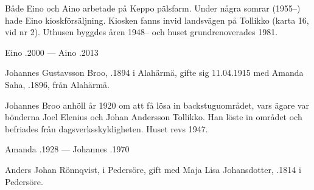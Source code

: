 Både Eino och Aino arbetade på Keppo pälsfarm. Under några somrar (1955--) hade Eino kioskförsäljning. Kiosken fanns invid landsvägen på Tollikko (karta 16, vid nr 2). Uthusen byggdes åren 1948-- och huset grundrenoverades 1981.

Eino .2000  ---  Aino .2013


%


%
Johannes Gustavsson Broo, .1894 i Alahärmä, gifte sig 11.04.1915 med Amanda Saha, .1896, från Alahärmä.
\begin{jhchildren}
  \item {}
  \item {}
  \item {}
  \item {}
\end{jhchildren}

Johannes Broo anhöll år 1920 om att få lösa in backstuguområdet, vars ägare var bönderna Joel Elenius och Johan Andersson Tollikko. Han löste in området och befriades från dagsverksskyldigheten. Huset revs 1947.

Amanda .1928  ---  Johannes .1970


%
Anders Johan Rönnqvist,  i Pedersöre, gift med Maja Lisa Johansdotter, .1814 i Pedersöre.
\begin{jhchildren}
  \item {}
  \item {}
  \item {}
  \item {}
  \item {}
  \item {}
  \item {}
  \item {}
\end{jhchildren}

